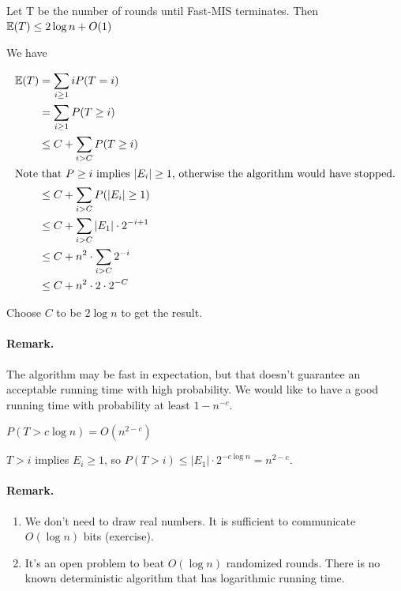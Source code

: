 \begin{lem} Let T be the number of rounds until Fast-MIS terminates. Then $\mathbb{E}(T) \leq 2\log n+O(1)$\end{lem}

\begin{pr} We have

\begin{align*}
\mathbb{E}(T) &= \sum_{i\geq 1} i P(T=i) \\
	&= \sum_{i\geq 1} P(T\geq i)\\
	&\leq C + \sum_{i> C} P(T\geq i)\\
\intertext{Note that $P\geq i$ implies $|E_i|\geq 1$, otherwise the algorithm would have stopped.}
	&\leq C+ \sum_{i> C} P(|E_i|\geq 1)\\
	&\leq C+ \sum_{i>C} |E_1|\cdot 2^{-i+1}\\
	&\leq C+ n^2 \cdot \sum_{i>C} 2^{-i}\\
	&\leq C+ n^2 \cdot 2\cdot 2^{-C}\\
\end{align*}

Choose $C$ to be $2\log n$ to get the result.
\end{pr}

\paragraph{Remark.} The algorithm may be fast in expectation, but that doesn't guarantee an acceptable running time with high probability. We would like to have a good running time with probability at least $1-n^{-c}$.

\begin{thm} $P(T> c\log n) = O(n^{2-c})$\end{thm}
\begin{pr} $T>i$ implies $E_i\geq 1$, so $P(T > i) \leq |E_1| \cdot 2^{-c\log n} = n^{2-c}$.\end{pr}

\paragraph{Remark.} \begin{enumerate}
\item We don't need to draw real numbers. It is sufficient to communicate $O(\log n)$ bits (exercise). 
\item It's an open problem to beat $O(\log n)$ randomized rounds. There is no known deterministic algorithm that has logarithmic running time.
\end{enumerate}

